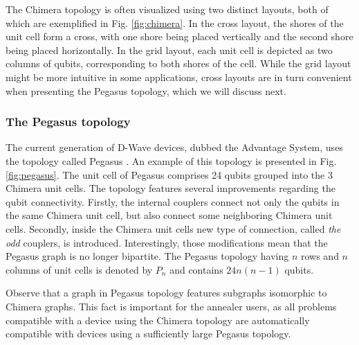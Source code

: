 The Chimera topology is often visualized using two distinct layouts, both of which are exemplified
in Fig. \ref{fig:chimera}. In the cross layout, the shores of the unit cell form a cross, with one
shore being placed vertically and the second shore being placed horizontally. In the grid layout,
each unit cell is depicted as two columns of qubits, corresponding to both shores of the cell. While
the grid layout might be more intuitive in some applications, cross layouts are in turn convenient
when presenting the Pegasus topology, which we will discuss next.

\subsubsection{The Pegasus topology}
The current generation of D-Wave devices, dubbed the Advantage System, uses the topology called
Pegasus \cite{boothby}. An example of this topology is presented in Fig. \ref{fig:pegasus}. The unit
cell of Pegasus comprises 24 qubits grouped into the 3 Chimera unit cells. The topology features
several improvements regarding the qubit connectivity. Firstly, the internal couplers connect not
only the qubits in the same Chimera unit cell, but also connect some neighboring Chimera unit cells.
Secondly, inside the Chimera unit cells new type of connection, called \emph{the odd} couplers, is
introduced. Interestingly, those modifications mean that the Pegasus graph is no longer bipartite.
The Pegasus topology having $n$ rows and $n$ columns of unit cells is denoted by $P_n$ and contains
$24n(n-1)$ qubits.

Observe that a graph in Pegasus topology features subgraphs isomorphic to Chimera graphs. This
fact is important for the annealer users, as all problems compatible with a device using the Chimera
topology are automatically compatible with devices using a sufficiently large Pegasus topology.

